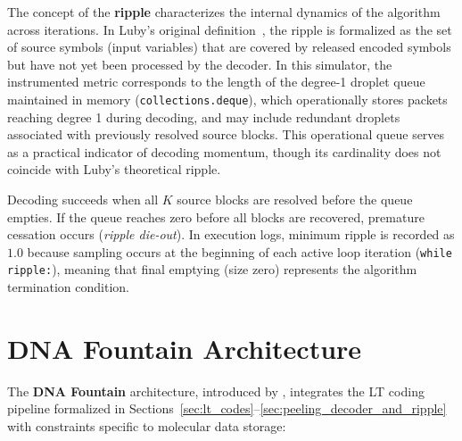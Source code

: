 The concept of the \textbf{ripple} characterizes the internal dynamics of the algorithm across iterations. In Luby's original definition~\cite{luby2002}, the ripple is formalized as the set of source symbols (input variables) that are covered by released encoded symbols but have not yet been processed by the decoder. In this simulator, the instrumented metric corresponds to the length of the degree-1 droplet queue maintained in memory (\texttt{collections.deque}), which operationally stores packets reaching degree 1 during decoding, and may include redundant droplets associated with previously resolved source blocks. This operational queue serves as a practical indicator of decoding momentum, though its cardinality does not coincide with Luby's theoretical ripple.

Decoding succeeds when all $K$ source blocks are resolved before the queue empties. If the queue reaches zero before all blocks are recovered, premature cessation occurs (\emph{ripple die-out}). In execution logs, minimum ripple is recorded as $1.0$ because sampling occurs at the beginning of each active loop iteration (\texttt{while ripple:}), meaning that final emptying (size zero) represents the algorithm termination condition.

\section{DNA Fountain Architecture}
\label{sec:dna_fountain_architecture}

The \textbf{DNA Fountain} architecture, introduced by , integrates the LT coding pipeline formalized in Sections~\ref{sec:lt_codes}--\ref{sec:peeling_decoder_and_ripple} with constraints specific to molecular data storage:

